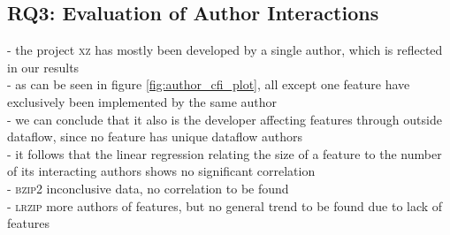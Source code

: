 \subsection*{\textbf{RQ3: Evaluation of Author Interactions}}\label{sec:eval_author_interactions}

- the project \textsc{xz} has mostly been developed by a single author, which is reflected in our results \\
- as can be seen in figure \ref{fig:author_cfi_plot}, all except one feature have exclusively been implemented by the same author \\
- we can conclude that it also is the developer affecting features through outside dataflow, since no feature has unique dataflow authors \\
- it follows that the linear regression relating the size of a feature to the number of its interacting authors shows no significant correlation \\

- \textsc{bzip2} inconclusive data, no correlation to be found \\
- \textsc{lrzip} more authors of features, but no general trend to be found due to lack of features \\

